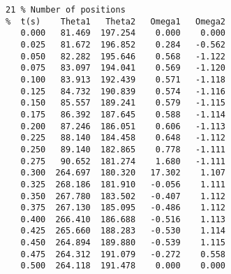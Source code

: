 \begin{verbatim}
21 % Number of positions
%  t(s)    Theta1   Theta2   Omega1   Omega2
   0.000   81.469  197.254    0.000    0.000
   0.025   81.672  196.852    0.284   -0.562
   0.050   82.282  195.646    0.568   -1.122
   0.075   83.097  194.041    0.569   -1.120
   0.100   83.913  192.439    0.571   -1.118
   0.125   84.732  190.839    0.574   -1.116
   0.150   85.557  189.241    0.579   -1.115
   0.175   86.392  187.645    0.588   -1.114
   0.200   87.246  186.051    0.606   -1.113
   0.225   88.140  184.458    0.648   -1.112
   0.250   89.140  182.865    0.778   -1.111
   0.275   90.652  181.274    1.680   -1.111
   0.300  264.697  180.320   17.302    1.107
   0.325  268.186  181.910   -0.056    1.111
   0.350  267.780  183.502   -0.407    1.112
   0.375  267.130  185.095   -0.486    1.112
   0.400  266.410  186.688   -0.516    1.113
   0.425  265.660  188.283   -0.530    1.114
   0.450  264.894  189.880   -0.539    1.115
   0.475  264.312  191.079   -0.272    0.558
   0.500  264.118  191.478    0.000    0.000
\end{verbatim}
